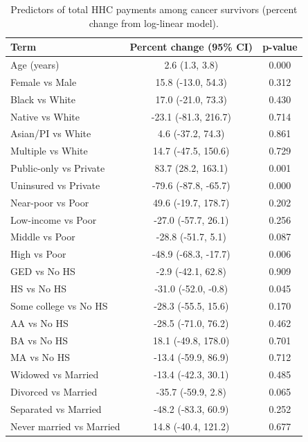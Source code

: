 
\begin{longtable}[t]{lcc}
\caption{\label{tab:tab:costs-cancer}Predictors of total HHC payments among cancer survivors (percent change from log-linear model).}\\
\toprule
Term & Percent change (95\% CI) & p-value\\
\midrule
Age (years) & 2.6 (1.3, 3.8) & 0.000\\
Female vs Male & 15.8 (-13.0, 54.3) & 0.312\\
Black vs White & 17.0 (-21.0, 73.3) & 0.430\\
Native vs White & -23.1 (-81.3, 216.7) & 0.714\\
Asian/PI vs White & 4.6 (-37.2, 74.3) & 0.861\\
\addlinespace
Multiple vs White & 14.7 (-47.5, 150.6) & 0.729\\
Public-only vs Private & 83.7 (28.2, 163.1) & 0.001\\
Uninsured vs Private & -79.6 (-87.8, -65.7) & 0.000\\
Near-poor vs Poor & 49.6 (-19.7, 178.7) & 0.202\\
Low-income vs Poor & -27.0 (-57.7, 26.1) & 0.256\\
\addlinespace
Middle vs Poor & -28.8 (-51.7, 5.1) & 0.087\\
High vs Poor & -48.9 (-68.3, -17.7) & 0.006\\
GED vs No HS & -2.9 (-42.1, 62.8) & 0.909\\
HS vs No HS & -31.0 (-52.0, -0.8) & 0.045\\
Some college vs No HS & -28.3 (-55.5, 15.6) & 0.170\\
\addlinespace
AA vs No HS & -28.5 (-71.0, 76.2) & 0.462\\
BA vs No HS & 18.1 (-49.8, 178.0) & 0.701\\
MA vs No HS & -13.4 (-59.9, 86.9) & 0.712\\
Widowed vs Married & -13.4 (-42.3, 30.1) & 0.485\\
Divorced vs Married & -35.7 (-59.9, 2.8) & 0.065\\
\addlinespace
Separated vs Married & -48.2 (-83.3, 60.9) & 0.252\\
Never married vs Married & 14.8 (-40.4, 121.2) & 0.677\\
\bottomrule
\end{longtable}
